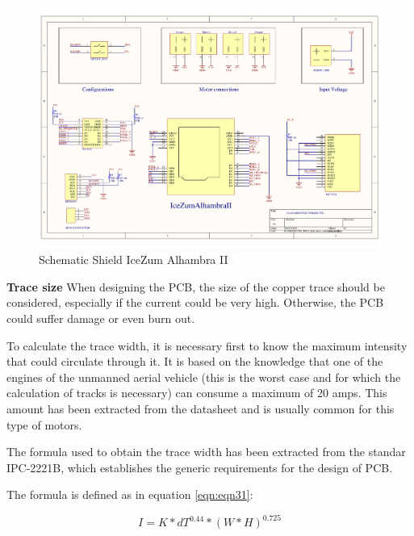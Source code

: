 \begin{center}
	\begin{figure}[H]
		\center
		\includegraphics[scale=0.6, angle=90]{imagenes/Balancing_Robot/pcb_dron_schematic.pdf}
		\caption{Schematic Shield IceZum Alhambra II}
		\label{fig:schematics_tfg}
	\end{figure}
\end{center}
\newpage

\textbf{Trace size} \newline
When designing the PCB, the size of the copper trace should be considered, especially if the current could be very high. Otherwise, the PCB could suffer damage or even burn out. \newline

To calculate the trace width, it is necessary first to know the maximum intensity that could circulate through it. It is based on the knowledge that one of the engines of the unmanned aerial vehicle (this is the worst case and for which the calculation of tracks is necessary) can consume a maximum of 20 amps. This amount has been extracted from the datasheet and is usually common for this type of motors. \newline

The formula used to obtain the trace width has been extracted from the standar IPC-2221B, which establishes the generic requirements for the design of PCB.\newline

The formula is defined as in equation \ref{eqn:eqn31}: 

\begin{equation}
I = K * dT^{0.44}*(W*H)^{0.725}
\label{eqn:eqn31}
\end{equation}

